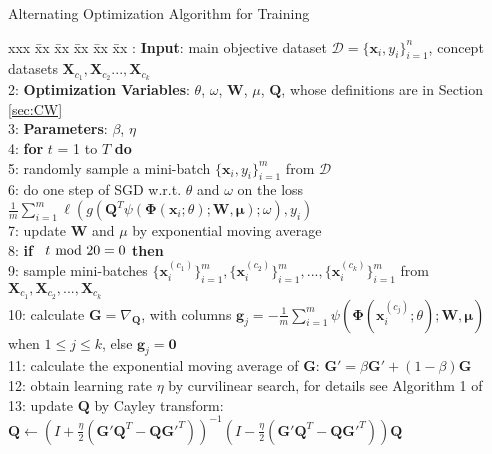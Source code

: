 \documentclass{article}
\begin{document}
\begin{algorithm*}[ht]
 \caption{Alternating Optimization Algorithm for Training}
 \begin{tabbing}
 xxx \= xx \= xx \= xx \= xx \= xx : \> \textbf{Input}: main objective dataset $\mathcal{D} = \{\mathbf{x}_i,y_i\}_{i=1}^{n} $, concept datasets $\mathbf{X}_{c_1},\mathbf{X}_{c_2}...,\mathbf{X}_{c_k}$ \\
 2: \> \textbf{Optimization Variables}: $\theta$, $\omega$, $\mathbf{W}$, $\mu$, $\mathbf{Q}$, whose definitions are in Section \ref{sec:CW} \\
 3: \> \textbf{Parameters}: $\beta$, $\eta$\\
 4: \> \textbf{for} $t$ = 1 to $T$ \textbf{do} \\
 5: \> \> randomly sample a mini-batch  $\{\mathbf{x}_i,y_i\}_{i=1}^{m}$ from $\mathcal{D}$ \\
 6: \> \> do one step of SGD w.r.t. $\theta$ and $\omega$ on the loss $\frac{1}{m}\sum_{i=1}^{m}\ell(g(\mathbf{Q}^T\psi(\mathbf{\Phi}(\mathbf{x}_i;\theta);\mathbf{W},\mathbf{\mu});\omega),y_i)$ \\
 7: \> \> update $\mathbf{W}$ and $\mu$ by exponential moving average \\
 8: \> \> \textbf{if} \ $t\hspace*{-3pt}\mod 20 = 0$ \textbf{then} \\
 9: \> \> \> sample mini-batches $\{\mathbf{x}_i^{(c_1)}\}_{i=1}^{m},\{\mathbf{x}_i^{(c_2)}\}_{i=1}^{m},...,\{\mathbf{x}_i^{(c_k)}\}_{i=1}^{m}$ from $\mathbf{X}_{c_1},\mathbf{X}_{c_2},...,\mathbf{X}_{c_k}$ \\
 10: \> \> \> calculate $\mathbf{G}=\nabla_{\mathbf{Q}}$, with columns $\mathbf{g}_j=-\frac{1}{m}\sum_{i=1}^{m}\psi(\mathbf{\Phi}(\mathbf{x}_{i}^{(c_j)};\theta);\mathbf{W},\mathbf{\mu})$ when $1\leq j \leq k$, else $\mathbf{g}_j=\mathbf{0}$ \\ 
 11: \> \> \> calculate the exponential moving average of $\mathbf{G}$: $\mathbf{G'} =  \beta \mathbf{G'} + (1-\beta) \mathbf{G}$ \\
 12: \> \> \> obtain learning rate $\eta$ by curvilinear search, for details see Algorithm 1 of \cite{wen2013feasible}  \\
 13: \> \> \> update $\mathbf{Q}$ by Cayley transform:  $\mathbf{Q}\leftarrow(I+\frac{\eta}{2}(\mathbf{G'}\mathbf{Q}^T-\mathbf{Q}\mathbf{G'}^T))^{-1}(I-\frac{\eta}{2}(\mathbf{G'}\mathbf{Q}^T-\mathbf{Q}\mathbf{G'}^T))\mathbf{Q}$
 \end{tabbing}
 \label{alg:twostep}
\end{algorithm*}
\end{document}
